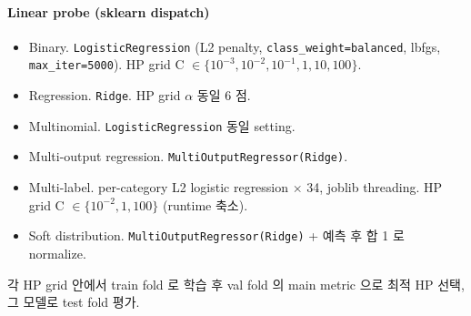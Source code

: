 \documentclass[a4paper,11pt]{article}
\begin{document}
\paragraph{Linear probe (sklearn dispatch)}
\begin{itemize}[leftmargin=*, itemsep=2pt]
  \item Binary. \texttt{LogisticRegression} (L2 penalty, \texttt{class\_weight=balanced}, lbfgs, \texttt{max\_iter=5000}). HP grid C $\in \{10^{-3}, 10^{-2}, 10^{-1}, 1, 10, 100\}$.
  \item Regression. \texttt{Ridge}. HP grid $\alpha$ 동일 6 점.
  \item Multinomial. \texttt{LogisticRegression} 동일 setting.
  \item Multi-output regression. \texttt{MultiOutputRegressor(Ridge)}.
  \item Multi-label. per-category L2 logistic regression $\times$ 34, joblib threading. HP grid C $\in \{10^{-2}, 1, 100\}$ (runtime 축소).
  \item Soft distribution. \texttt{MultiOutputRegressor(Ridge)} + 예측 후 합 1 로 normalize.
\end{itemize}
각 HP grid 안에서 train fold 로 학습 후 val fold 의 main metric 으로 최적 HP 선택, 그 모델로 test fold 평가.
\end{document}
